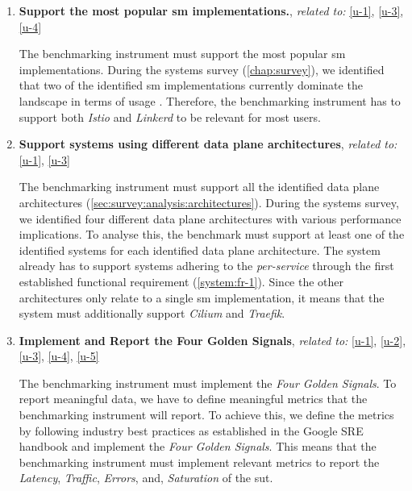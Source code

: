 \begin{enumerate}[label=\textbf{FR\arabic*}, leftmargin=3\parindent]
    \item \textbf{Support the most popular \gls{sm} implementations.}, \textit{related to:} \ref{u-1},  \ref{u-3}, \ref{u-4}
    \label{system:fr-1}
    
    The benchmarking instrument must support the most popular \gls{sm} implementations. During the systems survey (\cref{chap:survey}), we identified that two of the identified \gls{sm} implementations currently dominate the landscape in terms of usage \cite{cncf-survey-2021}. Therefore, the benchmarking instrument has to support both \textit{Istio} and \textit{Linkerd} to be relevant for most users. 
    
    \item \textbf{Support systems using different data plane architectures}, \textit{related to:} \ref{u-1}, \ref{u-3}
    \label{system:fr-2}
    
    The benchmarking instrument must support all the identified data plane architectures (\cref{sec:survey:analysis:architectures}). During the systems survey, we identified four different data plane architectures with various performance implications. To analyse this, the benchmark must support at least one of the identified systems for each identified data plane architecture. The system already has to support systems adhering to the \textit{per-service} through the first established functional requirement (\ref{system:fr-1}). Since the other architectures only relate to a single \gls{sm} implementation, it means that the system must additionally support  \textit{Cilium} and \textit{Traefik}.
    
    \item \textbf{Implement and Report the Four Golden Signals}, \textit{related to:} \ref{u-1}, \ref{u-2}, \ref{u-3}, \ref{u-4}, \ref{u-5} 
    \label{system:fr-3}
    
    The benchmarking instrument must implement the \textit{Four Golden Signals}. To report meaningful data, we have to define meaningful metrics that the benchmarking instrument will report. To achieve this, we define the metrics by following industry best practices as established in the Google SRE handbook \cite{beyer2016} and implement the \textit{Four Golden Signals}. This means that the benchmarking instrument must implement relevant metrics to report the \textit{Latency}, \textit{Traffic}, \textit{Errors}, and, \textit{Saturation} of the \gls{sut}.
    

\end{enumerate}
